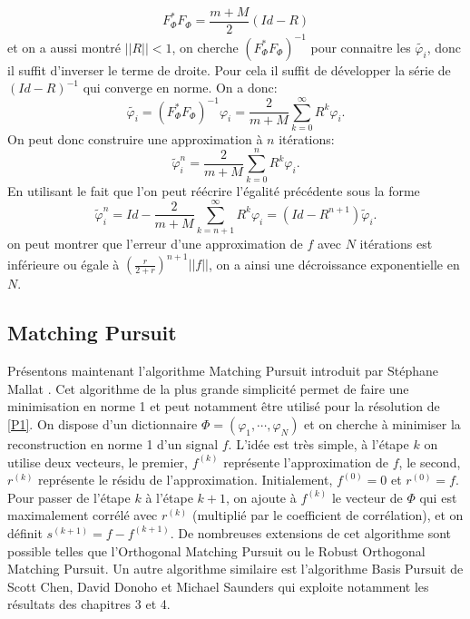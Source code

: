 \begin{equation}
	F_\Phi^*F_\Phi = \frac{m+M}{2} (Id - R)
\end{equation}
et on a aussi montré $||R||< 1$, on cherche $(F_\Phi^*F_\Phi)^{-1}$ pour connaitre les $\tilde{\varphi_i}$, donc il suffit d'inverser le terme de droite.
Pour cela il suffit de développer la série de $(Id-R)^{-1}$ qui converge en norme.
On a donc:
\begin{equation}
	\tilde{\varphi_i} = (F_\Phi^*F_\Phi)^{-1} \varphi_i = \frac{2}{m+M} \sum_{k=0}^\infty R^k \varphi_i. 
\end{equation}
On peut donc construire une approximation à $n$ itérations:
\begin{equation}
	\tilde{\varphi}_i^n = \frac{2}{m+M} \sum_{k=0}^n R^k \varphi_i. 
\end{equation}
En utilisant le fait que l'on peut réécrire l'égalité précédente sous la forme
\begin{equation}	
	\tilde{\varphi}_i^n = Id - \frac{2}{m+M} \sum_{k=n+1}^\infty R^k \varphi_i = (Id -R^{n+1})\tilde{\varphi}_i. 
\end{equation}
on peut montrer que l'erreur d'une approximation de $f$ avec $N$ itérations est inférieure ou égale à $(\frac{r}{2+r})^{n+1}||f||$, on a ainsi une décroissance exponentielle en $N$.

\subsection{Matching Pursuit}\label{MP}
Présentons maintenant l'algorithme Matching Pursuit introduit par Stéphane Mallat \cite{mpmallat}.
Cet algorithme de la plus grande simplicité permet de faire une minimisation en norme 1 et peut notamment être utilisé pour la résolution de \ref{P1}. 
\newline
On dispose d'un dictionnaire $\Phi =(\varphi_1, \cdots, \varphi_N)$ et on cherche à minimiser la reconstruction en norme 1 d'un signal $f$. 
L'idée est très simple, à l'étape $k$ on utilise deux vecteurs, le premier, $f^{(k)}$ représente l'approximation de $f$, le second, $r^{(k)}$ représente le résidu de l'approximation.
\newline
Initialement, $f^{(0)} = 0$ et $r^{(0)} = f$.
\newline
Pour passer de l'étape $k$ à l'étape $k+1$, on ajoute à $f^{(k)}$ le vecteur de $\Phi$ qui est maximalement corrélé avec $r^{(k)}$ (multiplié par le coefficient de corrélation), et on définit $s^{(k+1)} = f - f^{(k+1)}$.
\newline
De nombreuses extensions de cet algorithme sont possible telles que l'Orthogonal Matching Pursuit ou le Robust Orthogonal Matching Pursuit. Un autre algorithme similaire est l'algorithme Basis Pursuit de Scott Chen, David Donoho et Michael Saunders \cite{basispursuit} qui exploite notamment les résultats des chapitres 3 et 4.

